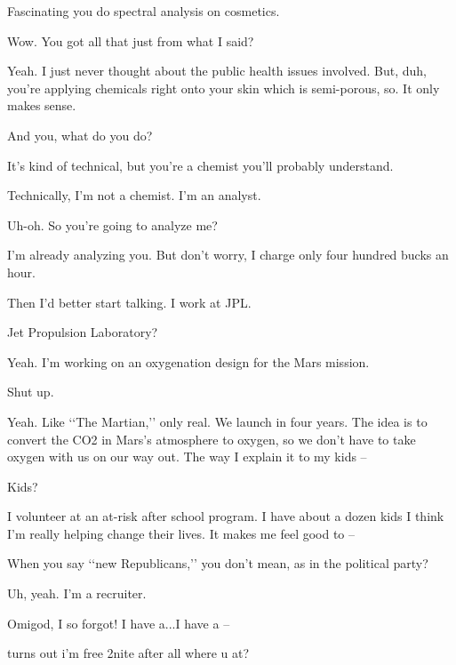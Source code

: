 \scene
{}

\je
Fascinating you do spectral analysis on cosmetics.

\ky
Wow.  You got all that just from what I said?

\je
Yeah.  I just never thought about the public health issues
involved.  But, duh, you’re applying chemicals right onto your
skin which is semi-porous, so.  It only makes sense.

\ky
{}
And you, what do you do?

\je
It’s kind of technical, but you’re a chemist you’ll probably understand.

\ky
Technically, I’m not a chemist.  I’m an analyst.

\je
Uh-oh.  So you’re going to analyze me?

\ky
I’m already analyzing you.  But don’t worry, I charge only four hundred bucks an hour.


\je
Then I’d better start talking.  I work at JPL.

\ky
{}
Jet Propulsion Laboratory?

\je
Yeah.  I’m working on an oxygenation design for the Mars mission.

\ky
Shut up.

\je
Yeah. Like ‘‘The Martian,’’ only real. We launch in four years. The idea is to convert the CO2 in Mars’s atmosphere to oxygen, so we don’t have to take oxygen with us on our way out. The way I explain it to my kids --

\ky
Kids?

\je
I volunteer at an at-risk after school program.  I have about a dozen kids I think I’m really helping change their lives.  It makes me feel good to --




\ky
When you say ‘‘new Republicans,’’ you don’t mean, as in the political party?

\je
Uh, yeah.  I’m a recruiter.

\ky
{}
Omigod, I so forgot!  I have a...I have a --




\underscoring

\je
turns out i'm free 2nite after all where u at?

